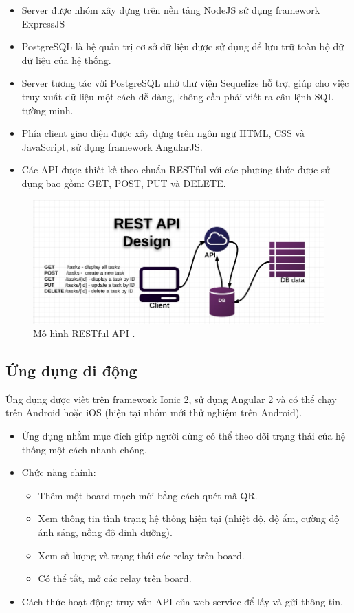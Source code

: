 \documentclass[a4paper,12pt,oneside]{article}
\begin{document}
\begin{itemize}
\item Server được nhóm xây dựng trên nền tảng NodeJS sử dụng framework ExpressJS 
\item PostgreSQL là hệ quản trị cơ sở dữ liệu được sử dụng để lưu trữ toàn bộ dữ dữ liệu của hệ thống.
\item Server tương tác với PostgreSQL nhờ thư viện Sequelize hỗ trợ, giúp cho việc truy xuất dữ liệu một cách dễ dàng, không cần phải viết ra câu lệnh SQL tường minh.
\item Phía client giao diện được xây dựng trên ngôn ngữ HTML, CSS và JavaScript, sử dụng framework AngularJS.
\item Các API được thiết kế theo chuẩn RESTful với các phương thức được sử dụng bao gồm: GET, POST, PUT và DELETE.
\end{itemize}

\begin{figure}[H]
	\centering
	\includegraphics[scale=.5]{hinh/RESTful-API-design.jpg}
	\caption{Mô hình RESTful API \cite{restfultech}.}
\end{figure}


\subsection{Ứng dụng di động}
\noindent Ứng dụng được viết trên framework Ionic 2, sử dụng Angular 2 và có thể chạy trên Android hoặc iOS (hiện tại nhóm mới thử nghiệm trên Android). 
\begin{itemize}
\item Ứng dụng nhằm mục đích giúp người dùng có thể theo dõi trạng thái của hệ thống một cách nhanh chóng.
\item Chức năng chính:
\begin{itemize}
\item Thêm một board mạch mới bằng cách quét mã QR. 
\item Xem thông tin tình trạng hệ thống hiện tại (nhiệt độ, độ ẩm, cường độ ánh sáng, nồng độ dinh dưỡng).
\item Xem số lượng và trạng thái các relay trên board. 
\item Có thể tắt, mở các relay trên board.
\end{itemize}
\item Cách thức hoạt động: truy vấn API của web service để lấy và gửi thông tin.
\end{itemize}
\end{document}
